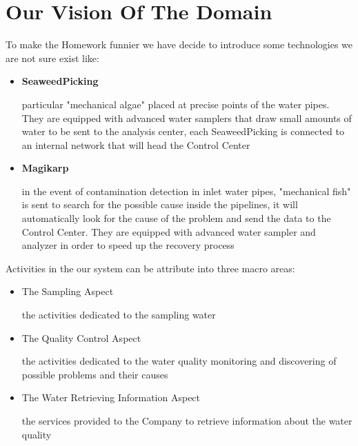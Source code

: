\newpage\chapter{\textbf{Our Vision Of The Domain}}
To make the Homework funnier we have decide to introduce some technologies we are not sure exist like:

\begin{itemize}
\item {\large \textbf{SeaweedPicking}}

\begin{description}
\par particular "mechanical algae" placed at precise points of the water pipes. They are equipped with advanced water samplers that draw small amounts of water to be sent to the analysis center, each SeaweedPicking is connected to an internal network that will head the Control Center
\end{description}

\item {\large \textbf{Magikarp}}

\begin{description}
\par in the event of contamination detection in inlet water pipes, "mechanical fish" is sent to search for the possible cause inside the pipelines, it will automatically look for the cause of the problem and send the data to the Control Center. They are equipped with advanced water sampler and analyzer in order to speed up the recovery process
\end{description}
 
\end{itemize}

Activities in the our system can be attribute into three macro areas:

\begin{itemize}

\item {The Sampling Aspect}
\begin{description}
the activities dedicated to the sampling water
\end{description}

\item {The Quality Control Aspect}
\begin{description}
the activities dedicated to the water quality monitoring and discovering of possible problems and their causes
\end{description}

\item {The Water Retrieving Information Aspect}
\begin{description}
the services provided to the Company to retrieve information about the water quality
\end{description}

\end{itemize}


